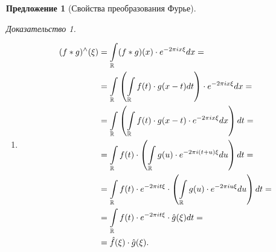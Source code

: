 \documentclass[a5paper, 10pt]{article}
\theoremstyle{definition}
\theoremstyle{plain}
\newtheorem*{Prop}{Предложение}
\theoremstyle{remark}
\newtheorem*{Proof}{Доказательство}
\begin{document}
\begin{Prop}[Свойства преобразования Фурье]
\begin{Proof}
\begin{enumerate}
            Воспользуемся эквивалентным определением принадлежности пространству Шварца:
            \[
                \forall\, \alpha,\beta \in \Z_+ \quad \sup\limits_\xi \hm{\hr{\xi^\beta \hat{f}(\xi)}^{(\alpha)}} < \infty.
            \] 

            Из 9-ого свойства:
            \[
                \xi^\beta \hat{f}(\xi) = \frac{1}{(2\pi i)^\beta} (f^{(\beta)})^\wedge (\xi).
            \] 
            Взяв производную с двух сторон и применив 10-ое свойство, получаем
            \[
                \hr{\xi^\beta \hat{f}(\xi)}^{(\alpha)} = \frac{1}{(2\pi i)^\beta} \hr{\hr{-2\pi i \star}^{\alpha} f^{(\beta)}}^\wedge (\xi) = \frac{(-2\pi i)^\alpha}{(2\pi i)^\beta} \hr{\star^\alpha f^{(\beta)}}^\wedge (\xi).
            \] 
            Тогда, переходя к нормам, по 3-ему свойству
            \[
                \|\hr{\xi^\beta \hat{f}(\xi)}^{(\alpha)}\| \leqslant  \frac{(2\pi )^\alpha}{(2\pi )^\beta} \int\limits_\R \hm{x^\alpha f^{(\beta)}(x)} dx.
            \] 
            Так как сама $f^{(\beta)}$ лежит в пространстве Шварца, то по одному из определений $f^{(\beta)}(x) \leqslant \frac{C_{N,\alpha}}{(1+|x|)^N}$. Возьмем, например, $N=\alpha+2$.
            \[
                \frac{(2\pi i)^\alpha}{(2\pi i)^\beta} \int\limits_\R \hm{x^\alpha f^{(\beta)}(x)} dx \leqslant \frac{(2\pi)^\alpha}{(2\pi)^\beta} \int\limits_\R \frac{|x|^\alpha C}{(1+|x|)^{\alpha+2}} dx < \infty.
            \] 
        \item \[
                \begin{split}
                    (f*g)^\wedge (\xi) &= \int\limits_{\mathbb{R}} (f*g)(x) \cdot e^{-2\pi i x\xi}dx = \\
                                       &= \int\limits_{\mathbb{R}} \left(\int\limits_{\mathbb{R}} f(t) \cdot g(x-t) dt\right) \cdot e^{-2\pi i x\xi}dx = \\
                                       &= \int\limits_{\mathbb{R}} \left(\int\limits_{\mathbb{R}} f(t) \cdot g(x-t)\cdot e^{-2\pi i x\xi}dx\right)dt = \\
                                       &= \int\limits_{\mathbb{R}} f(t)\cdot \left(\int\limits_{\mathbb{R}} g(u)\cdot e^{-2\pi i (t+u)\xi}du\right)dt =\\
                                       &= \int\limits_{\mathbb{R}} f(t) \cdot e^{-2\pi i t \xi} \cdot \left(\int\limits_{\mathbb{R}} g(u)\cdot e^{-2\pi i u\xi}du\right) dt = \\
                                       &= \int\limits_{\mathbb{R}} f(t) \cdot e^{-2\pi i t \xi} \cdot \hat{g}(\xi) dt =\\
                                       &= \hat{f}(\xi) \cdot \hat{g}(\xi).
                \end{split}
        \]  
            \end{enumerate}
        \end{Proof}
    \end{Prop}
\end{document}
